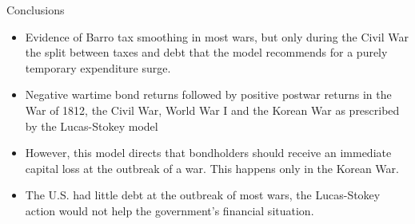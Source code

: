 \documentclass[11pt,xcolor={dvipsnames},aspectratio=159,hyperref={pdftex,pdfpagemode=UseNone,hidelinks,pdfdisplaydoctitle=true},usepdftitle=false]{beamer}
\begin{document}
\begin{frame}{Conclusions}
    
 \begin{itemize}
\item  Evidence of Barro tax smoothing in most wars, but only during the Civil War the split between taxes and debt that the model recommends for a purely temporary expenditure
surge. 
\item Negative wartime bond returns followed by positive postwar returns in the
War of 1812, the Civil War, World War I and the Korean War as prescribed by the Lucas-Stokey
model 
\item However, this model directs that bondholders should receive an immediate capital loss
at the outbreak of a war. This happens  only in the Korean War. 
\item The U.S. had little debt at the outbreak of most wars, the Lucas-Stokey
action would not help the government's financial situation.
 \end{itemize}

\end{frame}
\end{document}
